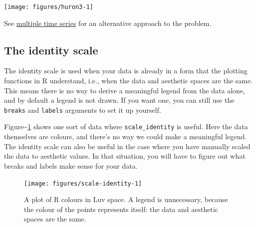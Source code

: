 \texttt{[image: figures/huron3-1]}

See \hyperref[sub:time-series]{multiple time series} for an alternative
approach to the problem.

\subsection{The identity scale}\label{sub:scale-identity}

The identity scale is used when your data is already in a form that the
plotting functions in R understand, i.e., when the data and aesthetic
spaces are the same. This means there is no way to derive a meaningful
legend from the data alone, and by default a legend is not drawn. If you
want one, you can still use the \texttt{breaks} and \texttt{labels}
arguments to set it up yourself. 

Figure\textasciitilde{}\ref{fig:scale-identity} shows one sort of data
where \texttt{scale\_identity} is useful. Here the data themselves are
colours, and there's no way we could make a meaningful legend. The
identity scale can also be useful in the case where you have manually
scaled the data to aesthetic values. In that situation, you will have to
figure out what breaks and labels make sense for your data.

\begin{Shaded}
\begin{Highlighting}[]
\StringTok{ }\NormalTok{()}
\StringTok{ }\NormalTok{(}\NormalTok{(}\NormalTok{(}\NormalTok{, }\NormalTok{))}
  \NormalTok{(}\NormalTok{)) +}\StringTok{ }\NormalTok{() +}
\StringTok{   }\NormalTok{()}
\end{Highlighting}
\end{Shaded}

\begin{figure}
\texttt{[image: figures/scale-identity-1]} \caption{A plot of R colours in Luv space.  A legend is unnecessary, because the colour of the points represents itself: the data and aesthetic spaces are the same.\label{fig:scale-identity}}
\end{figure}

